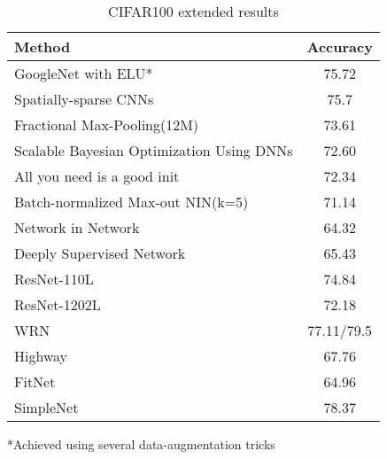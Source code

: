 \documentclass{article} \usepackage{lets_keepit_simple,times}
\begin{document}
\begin{table}[H]
\caption{CIFAR100 extended results}\label{tab:cifar100_appndx}
\begin{center}
\begin{tabular}{lc}
\textbf{Method} & \textbf{Accuracy}\\ \hline
GoogleNet with ELU\cite{Clevert_Fast_n_accurat_ELU_2015}* & 75.72 \\
Spatially-sparse CNNs\cite{Graham_Spatilly_sparse_CNN_2014} & 75.7 \\
Fractional Max-Pooling(12M) \cite{Graham_FractionalMaxpooling_2014} & 73.61 \\
\small{Scalable Bayesian Optimization Using DNNs}\cite{Snoek_ScalableBayesianoptemiz_2015} & 72.60 \\
All you need is a good init\cite{Mishkin_AllYouNeedIsGoodInit_2016} & 72.34 \\
Batch-normalized Max-out NIN(k=5)\cite{JiaRen_BatchNormMaxoutNIN_2015} & 71.14 \\
Network in Network\cite{Lin_NIN_2013} & 64.32 \\
Deeply Supervised Network\cite{Lee_DeeplySupervisedNet_2015} & 65.43 \\
ResNet-110L\cite{He_ResNet_2015} & 74.84 \\
ResNet-1202L\cite{He_ResNet_2015} & 72.18 \\
WRN\cite{Zagoruyko_WRN_2016} & 77.11/79.5 \\
Highway\cite{Srivastava_HighwayNets_2015} & 67.76 \\
FitNet\cite{Romero_Fitnet_2014} & 64.96 \\
SimpleNet & 78.37 \\ \hline
\end{tabular}
\end{center}
\end{table}

*Achieved using several data-augmentation tricks
\end{document}
